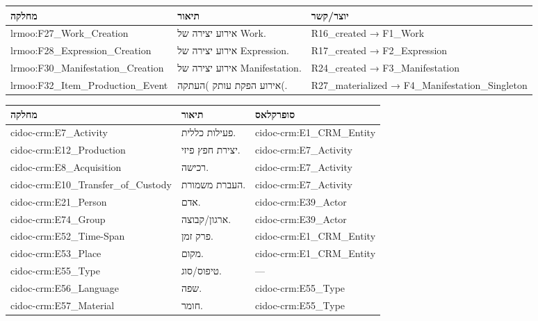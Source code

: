 {\small
\begin{longtable}{|p{4.5cm}|p{8.5cm}|p{3cm}|}
\hline
\textbf{מחלקה} & \textbf{תיאור} & \textbf{יוצר/קשר} \\
\hline
\endhead

\textenglish{lrmoo:F27\_Work\_Creation} & אירוע יצירה של \textenglish{Work}. & \textenglish{R16\_created → F1\_Work} \\
\hline
\textenglish{lrmoo:F28\_Expression\_Creation} & אירוע יצירה של \textenglish{Expression}. & \textenglish{R17\_created → F2\_Expression} \\
\hline
\textenglish{lrmoo:F30\_Manifestation\_Creation} & אירוע יצירה של \textenglish{Manifestation}. & \textenglish{R24\_created → F3\_Manifestation} \\
\hline
\textenglish{lrmoo:F32\_Item\_Production\_Event} & אירוע הפקת עותק )העתקה(. & \textenglish{R27\_materialized → F4\_Manifestation\_Singleton} \\
\hline
\end{longtable}
}

{\small
\begin{longtable}{|p{4.5cm}|p{8.5cm}|p{3cm}|}
\hline
\textbf{מחלקה} & \textbf{תיאור} & \textbf{סופרקלאס} \\
\hline
\endhead

\textenglish{cidoc-crm:E7\_Activity} & פעילות כללית. & \textenglish{cidoc-crm:E1\_CRM\_Entity} \\
\hline
\textenglish{cidoc-crm:E12\_Production} & יצירת חפץ פיזי. & \textenglish{cidoc-crm:E7\_Activity} \\
\hline
\textenglish{cidoc-crm:E8\_Acquisition} & רכישה. & \textenglish{cidoc-crm:E7\_Activity} \\
\hline
\textenglish{cidoc-crm:E10\_Transfer\_of\_Custody} & העברת משמורת. & \textenglish{cidoc-crm:E7\_Activity} \\
\hline
\textenglish{cidoc-crm:E21\_Person} & אדם. & \textenglish{cidoc-crm:E39\_Actor} \\
\hline
\textenglish{cidoc-crm:E74\_Group} & ארגון/קבוצה. & \textenglish{cidoc-crm:E39\_Actor} \\
\hline
\textenglish{cidoc-crm:E52\_Time-Span} & פרק זמן. & \textenglish{cidoc-crm:E1\_CRM\_Entity} \\
\hline
\textenglish{cidoc-crm:E53\_Place} & מקום. & \textenglish{cidoc-crm:E1\_CRM\_Entity} \\
\hline
\textenglish{cidoc-crm:E55\_Type} & טיפוס/סוג. & — \\
\hline
\textenglish{cidoc-crm:E56\_Language} & שפה. & \textenglish{cidoc-crm:E55\_Type} \\
\hline
\textenglish{cidoc-crm:E57\_Material} & חומר. & \textenglish{cidoc-crm:E55\_Type} \\
\hline
\end{longtable}
}


